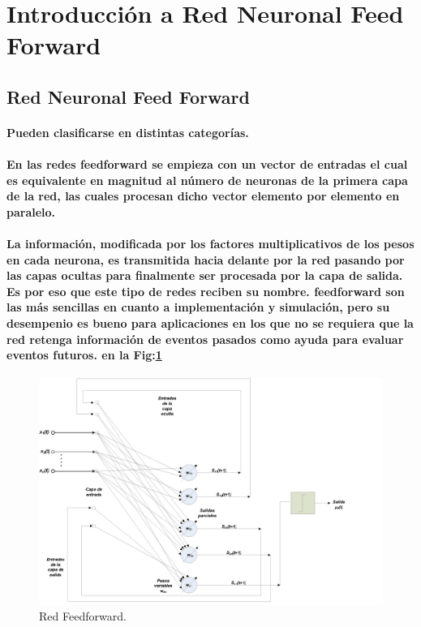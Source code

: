 \documentclass[10pt,a4paper]{article}
\begin{document}
{\begin{center}
\par\vspace{1.5cm}

\end{center}
\clearpage

}

\printindex

\section{
Introducci\'on a Red Neuronal Feed Forward
}
\subsection{Red Neuronal Feed Forward}
\paragraph{
Pueden clasificarse en distintas categor\'ias.
}
\paragraph{
En las redes feedforward se empieza con un vector de entradas el cual es equivalente en magnitud al n\'umero de neuronas de la primera capa de la red, las cuales procesan dicho vector elemento por elemento en paralelo.
}
\paragraph{
La informaci\'on, modificada por los factores multiplicativos de los pesos en cada neurona, es transmitida hacia delante por la red pasando por las capas ocultas para finalmente ser procesada por la capa de salida. Es por eso que este tipo de redes reciben su nombre.
feedforward son las m\'as sencillas en cuanto a implementaci\'on y simulaci\'on, pero su desempenio es bueno para aplicaciones en los que no se requiera que la red retenga informaci\'on de eventos pasados como ayuda para evaluar eventos futuros.
 en la Fig:\ref{fig:Compuertas}
}



\begin{figure}[H]
\includegraphics[scale=0.15] {neuro.png}
\caption{Red Feedforward.}
\label{fig:Compuertas}
\end{figure}
\end{document}
